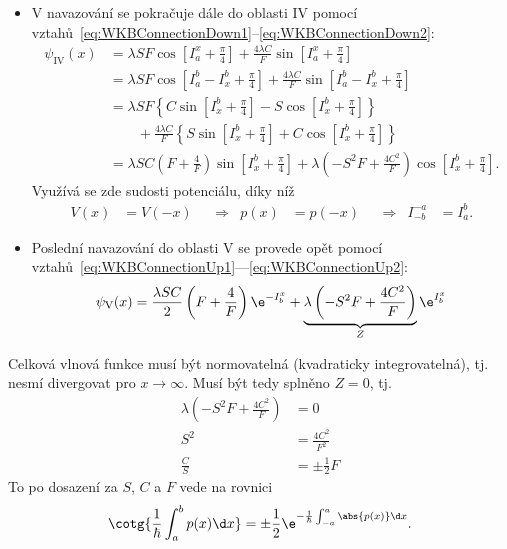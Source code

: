 \begin{solution}
\begin{enumerate}
\begin{itemize}
		\item
			V navazování se pokračuje dále do oblasti IV pomocí vztahů~\eqref{eq:WKBConnectionDown1}--\eqref{eq:WKBConnectionDown2}:
			\begin{align}
				\psi_{\mathrm{IV}}(x)
					&=\lambda SF\cos\left[I_{a}^{x}+\frac{\pi}{4}\right]+\frac{4\lambda C}{F}\sin\left[I_{a}^{x}+\frac{\pi}{4}\right]\nonumber\\
					&=\lambda SF\cos\left[I_{a}^{b}-I_{x}^{b}+\frac{\pi}{4}\right]+\frac{4\lambda C}{F}\sin\left[I_{a}^{b}-I_{x}^{b}+\frac{\pi}{4}\right]\nonumber\\
					&=\lambda SF\left\{C\sin\left[I_{x}^{b}+\frac{\pi}{4}\right]-S\cos\left[I_{x}^{b}+\frac{\pi}{4}\right]\right\}\nonumber\\
					&\qquad+\frac{4\lambda C}{F}\left\{S\sin\left[I_{x}^{b}+\frac{\pi}{4}\right]+C\cos\left[I_{x}^{b}+\frac{\pi}{4}\right]\right\}\nonumber\\
					&=\lambda SC\left(F+\frac{4}{F}\right)\sin\left[I_{x}^{b}+\frac{\pi}{4}\right]+\lambda\left(-S^{2}F+\frac{4C^{2}}{F}\right)\cos\left[I_{x}^{b}+\frac{\pi}{4}\right].
			\end{align}
			Využívá se zde sudosti potenciálu, díky níž
			\begin{align}
				V(x)&=V(-x) && \Longrightarrow & p(x)&=p(-x) && \Longrightarrow & I_{-b}^{-a}&=I_{a}^{b}.
			\end{align}
			
		\item
			Poslední navazování do oblasti V se provede opět pomocí vztahů~\eqref{eq:WKBConnectionUp1}---\eqref{eq:WKBConnectionUp2}:
			\begin{equation}
				\psi_{\mathrm{V}}(x)=\frac{\lambda SC}{2}\left(F+\frac{4}{F}\right)\e^{-I_{b}^{x}}+\underbrace{\lambda\left(-S^{2}F+\frac{4C^{2}}{F}\right)}_{Z}\e^{I_{b}^{x}}
			\end{equation}		
		\end{itemize}
	
		Celková vlnová funkce musí být normovatelná (kvadraticky integrovatelná), tj. nesmí divergovat  pro $x\rightarrow\infty$.
		Musí být tedy splněno $Z=0$, tj.
		\begin{align}
			\lambda\left(-S^{2}F+\frac{4C^{2}}{F}\right)&=0\nonumber\\
			S^{2}&=\frac{4C^{2}}{F^{2}}\nonumber\\
			\frac{C}{S}&=\pm\frac{1}{2}F
		\end{align}
		To po dosazení za $S$, $C$ a $F$ vede na rovnici
		\begin{align}
			\cotg{\frac{1}{\hbar}\int_{a}^{b}p(x)\d x}=\pm\frac{1}{2}\e^{-\frac{1}{\hbar}\int_{-a}^{a}\abs{p(x)}\d x}.
		\end{align}
		

\end{enumerate}
\end{solution}
